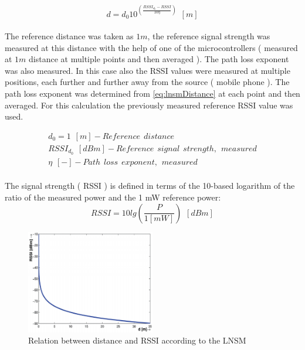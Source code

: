 \documentclass[11pt,a4paper]{article}
\numberwithin{equation}{section}   %
\numberwithin{figure}{section}     %
\numberwithin{table}{section}      %
\begin{document}
\begin{equation}
    d = d_0 10^{\left(\frac{RSSI_{d_0}-RSSI}{10 \eta}\right)} \hspace{5pt} [m]
    \label{eq:lnsmDistance}
\end{equation}\\


The reference distance was taken as $1 m$, the reference signal strength was measured at this distance with the help of one of the microcontrollers ( measured at $1 m$ distance at multiple points and then averaged ). The path loss exponent was also measured. In this case also the RSSI values were measured at multiple positions, each further and further away from the source ( mobile phone ). The path loss exponent was determined from \ref{eq:lnsmDistance} at each point and then averaged. For this calculation the previously measured reference RSSI value was used.

\begin{gather*}
    d_0 = 1 \hspace{5pt} [m] - Reference \hspace{5pt} distance \\
    RSSI_{d_0} \hspace{5pt} [dBm] - Reference \hspace{5pt} signal \hspace{5pt} strength, \hspace{5pt} measured \\
    \eta \hspace{5pt} [-] - Path \hspace{5pt} loss \hspace{5pt} exponent, \hspace{5pt} measured
\end{gather*}\\


The signal strength ( RSSI ) is defined in terms of the 10-based logarithm of the ratio of the measured power and the 1 mW reference power:\\

\begin{equation*}
    RSSI = 10 lg\left(\frac{P}{1 [mW]}\right) \hspace{5pt} [dBm]
\end{equation*}

\begin{figure}[H]
    \centering
    \includegraphics[width = 0.5\textwidth]{figures/idealRelationBetweenRSSIandDistance.PNG}
    \caption{Relation between distance and RSSI according to the LNSM \cite{BottaSimek}}
    \label{fig:rssiAndDistance}
\end{figure}
\end{document}
